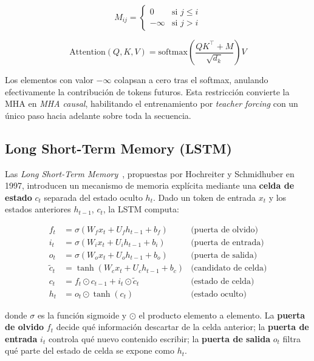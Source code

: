 \begin{equation}
    M_{ij} = \begin{cases} 0 & \text{si } j \leq i \\ -\infty & \text{si } j > i \end{cases}
\end{equation}

\begin{equation}
    \text{Attention}(Q, K, V) = \text{softmax}\!\left(\frac{QK^\top + M}{\sqrt{d_k}}\right) V
\end{equation}

Los elementos con valor $-\infty$ colapsan a cero tras el softmax, anulando efectivamente la contribución de tokens futuros. Esta restricción convierte la MHA en \textit{MHA causal}, habilitando el entrenamiento por \textit{teacher forcing} con un único paso hacia adelante sobre toda la secuencia.

\subsection{Long Short-Term Memory (LSTM)}

Las \textit{Long Short-Term Memory}~\cite{hochreiter1997lstm}, propuestas por Hochreiter y Schmidhuber en 1997, introducen un mecanismo de memoria explícita mediante una \textbf{celda de estado} $c_t$ separada del estado oculto $h_t$. Dado un token de entrada $x_t$ y los estados anteriores $h_{t-1}$, $c_t$, la LSTM computa:

\begin{align}
    f_t &= \sigma(W_f x_t + U_f h_{t-1} + b_f) & \text{(puerta de olvido)} \\
    i_t &= \sigma(W_i x_t + U_i h_{t-1} + b_i) & \text{(puerta de entrada)} \\
    o_t &= \sigma(W_o x_t + U_o h_{t-1} + b_o) & \text{(puerta de salida)} \\
    \tilde{c}_t &= \tanh(W_c x_t + U_c h_{t-1} + b_c) & \text{(candidato de celda)} \\
    c_t &= f_t \odot c_{t-1} + i_t \odot \tilde{c}_t & \text{(estado de celda)} \\
    h_t &= o_t \odot \tanh(c_t) & \text{(estado oculto)}
\end{align}

donde $\sigma$ es la función sigmoide y $\odot$ el producto elemento a elemento. La \textbf{puerta de olvido} $f_t$ decide qué información descartar de la celda anterior; la \textbf{puerta de entrada} $i_t$ controla qué nuevo contenido escribir; la \textbf{puerta de salida} $o_t$ filtra qué parte del estado de celda se expone como $h_t$.


